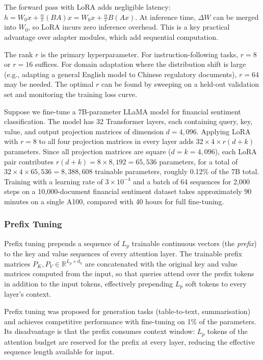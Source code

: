 \begin{deepdive}
The forward pass with LoRA adds negligible latency:
$h = W_0 x + \tfrac{\alpha}{r}(BA)x = W_0 x + \tfrac{\alpha}{r}B(Ax)$.
At inference time, $\Delta W$ can be merged into $W_0$, so LoRA incurs zero
inference overhead.  This is a key practical advantage over adapter modules,
which add sequential computation.

The rank $r$ is the primary hyperparameter.  For instruction-following tasks,
$r = 8$ or $r = 16$ suffices.  For domain adaptation where the distribution
shift is large (e.g., adapting a general English model to Chinese regulatory
documents), $r = 64$ may be needed.  The optimal $r$ can be found by sweeping
on a held-out validation set and monitoring the training loss curve.

\begin{example}
\label{ex:lora-sentiment}
Suppose we fine-tune a 7B-parameter LLaMA model for financial sentiment
classification.  The model has 32 Transformer layers, each containing query,
key, value, and output projection matrices of dimension $d = 4{,}096$.
Applying LoRA with $r = 8$ to all four projection matrices in every layer
adds $32 \times 4 \times r(d + k)$ parameters.  Since all projection matrices
are square ($d = k = 4{,}096$), each LoRA pair contributes $r(d+k) = 8 \times 8{,}192 = 65{,}536$
parameters, for a total of $32 \times 4 \times 65{,}536 = 8{,}388{,}608$ trainable
parameters, roughly 0.12\% of the 7B total.  Training with a learning rate
of $3 \times 10^{-4}$ and a batch of 64 sequences for 2{,}000 steps on a
10{,}000-document financial sentiment dataset takes approximately 90 minutes on a
single A100, compared with 40 hours for full fine-tuning.
\end{example}

\subsubsection*{Prefix Tuning}

Prefix tuning \cite{li2021prefix} prepends a sequence of $L_p$ trainable
continuous vectors (the \emph{prefix}) to the key and value sequences of every
attention layer.  The trainable prefix matrices $P_K, P_V \in \mathbb{R}^{L_p \times d_h}$
are concatenated with the original key and value matrices computed from the input,
so that queries attend over the prefix tokens in addition to the input tokens,
effectively prepending $L_p$ soft tokens to every layer's context.

Prefix tuning was proposed for generation tasks (table-to-text, summarisation)
and achieves competitive performance with fine-tuning on 1\% of the parameters.
Its disadvantage is that the prefix consumes context window: $L_p$ tokens of
the attention budget are reserved for the prefix at every layer, reducing the
effective sequence length available for input.


\end{deepdive}

